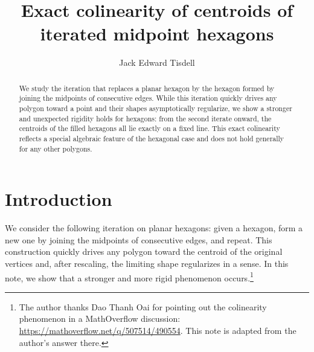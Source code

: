 \documentclass{amsart}
\title{Exact colinearity of centroids of iterated midpoint hexagons}
\author{Jack Edward Tisdell}
\theoremstyle{definition}
\begin{document}
\maketitle


\begin{abstract}
    We study the iteration that replaces a planar hexagon by the hexagon formed by joining the midpoints of consecutive edges. While this iteration quickly drives any polygon toward a point and their shapes asymptotically regularize, we show a stronger and unexpected rigidity holds for hexagons: from the second iterate onward, the centroids of the filled hexagons all lie exactly on a fixed line. This exact colinearity reflects a special algebraic feature of the hexagonal case and does not hold generally for any other polygons.
\end{abstract}

\section{Introduction}
\label{sec:intro}


We consider the following iteration on planar hexagons: given a hexagon, form a new one by joining the midpoints of consecutive edges, and repeat. This construction quickly drives any polygon toward the centroid of the original vertices and, after rescaling, the limiting shape regularizes in a sense. In this note, we show that a stronger and more rigid phenomenon occurs.\footnote{The author thanks Dao Thanh Oai for pointing out the colinearity phenomenon in a MathOverflow discussion: \url{https://mathoverflow.net/q/507514/490554}. This note is adapted from the author's answer there.}
\end{document}
